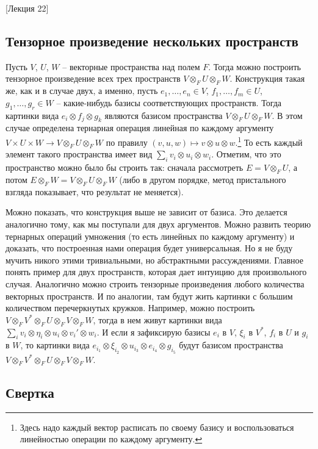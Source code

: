 [Лекция 22]

\subsection*{Тензорное произведение нескольких пространств}

Пусть $V$, $U$, $W$ -- векторные пространства над полем $F$. Тогда можно построить тензорное произведение всех трех пространств $V\otimes_F U\otimes_F W$. Конструкция такая же, как и в случае двух, а именно, пусть $e_1,\ldots,e_n\in V$, $f_1,\ldots,f_m\in U$, $g_1,\ldots, g_r\in W$ -- какие-нибудь базисы соответствующих пространств. Тогда картинки вида $e_i\otimes f_j\otimes g_k$ являются базисом пространства $V\otimes_F U\otimes_F W$. В этом случае определена тернарная операция линейная по каждому аргументу $V\times U\times W\to V\otimes_F U\otimes_F W$ по правилу $(v, u, w)\mapsto v\otimes u\otimes w$.\footnote{Здесь надо каждый вектор расписать по своему базису и воспользоваться линейностью операции по каждому аргументу.} То есть каждый элемент такого пространства имеет вид $\sum_i v_i\otimes u_i\otimes w_i$. Отметим, что это пространство можно было бы строить так: сначала рассмотреть $E = V\otimes_F U$, а потом $E\otimes_F W = V\otimes_F U \otimes_F W$ (либо в другом порядке, метод пристального взгляда показывает, что результат не меняется). 

Можно показать, что конструкция выше не зависит от базиса. Это делается аналогично тому, как мы поступали для двух аргументов. Можно развить теорию тернарных операций умножения (то есть линейных по каждому аргументу) и доказать, что построенная нами операция будет универсальная. Но я не буду мучить никого этими тривиальными, но абстрактными рассуждениями. Главное понять пример для двух пространств, которая дает интуицию для произвольного случая.  Аналогично можно строить тензорные произведения любого количества векторных пространств. И по аналогии, там будут жить картинки с большим количеством перечеркнутых кружков. Например, можно построить $V\otimes_F V^* \otimes_F U \otimes_F V \otimes_F W$, тогда в нем живут картинки вида $\sum_i v_i\otimes \eta_i\otimes u_i \otimes v_i'\otimes w_i$. И если я зафиксирую базисы $e_i$ в $V$, $\xi_i$ в $V^*$, $f_i$ в $U$ и $g_i$ в $W$, то картинки вида $e_{i_1}\otimes \xi_{i_2}\otimes u_{i_3}\otimes e_{i_4}\otimes g_{i_5}$ будут базисом пространства $V\otimes_F V^* \otimes_F U \otimes_F V \otimes_F W$.


\subsection*{Свертка}

